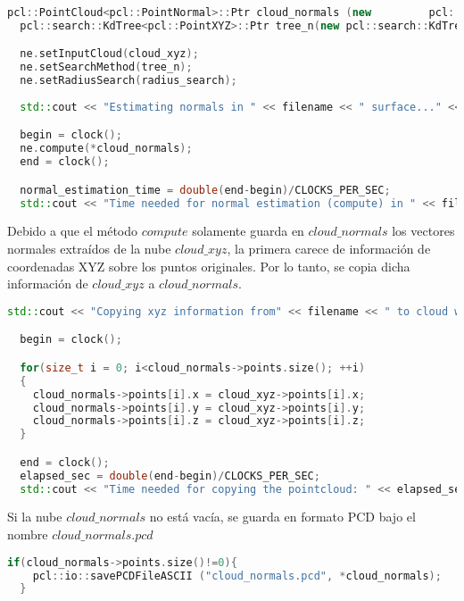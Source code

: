 \begin{lstlisting}[language=C++,breaklines]
  pcl::PointCloud<pcl::PointNormal>::Ptr cloud_normals (new 		pcl::PointCloud<pcl::PointNormal>);
  pcl::search::KdTree<pcl::PointXYZ>::Ptr tree_n(new pcl::search::KdTree<pcl::PointXYZ>());

  ne.setInputCloud(cloud_xyz);
  ne.setSearchMethod(tree_n);
  ne.setRadiusSearch(radius_search);
 
  std::cout << "Estimating normals in " << filename << " surface..." <<std::endl;

  begin = clock();
  ne.compute(*cloud_normals);
  end = clock();

  normal_estimation_time = double(end-begin)/CLOCKS_PER_SEC;
  std::cout << "Time needed for normal estimation (compute) in " << filename << ": " << normal_estimation_time << " seconds" << std::endl << std::endl;
\end{lstlisting}
  
Debido a que el método $compute$ solamente guarda en $cloud\_normals$ los vectores normales extraídos de la nube $cloud\_xyz$, la primera carece de información de coordenadas XYZ sobre los puntos originales. Por lo tanto, se copia dicha información de $cloud\_xyz$ a $cloud\_normals$.

\begin{lstlisting}[language=C++,breaklines]
  std::cout << "Copying xyz information from" << filename << " to cloud with normals information..." << std::endl;

  begin = clock();

  for(size_t i = 0; i<cloud_normals->points.size(); ++i)
  {
  	cloud_normals->points[i].x = cloud_xyz->points[i].x;
  	cloud_normals->points[i].y = cloud_xyz->points[i].y;
  	cloud_normals->points[i].z = cloud_xyz->points[i].z;
  }

  end = clock();
  elapsed_sec = double(end-begin)/CLOCKS_PER_SEC;
  std::cout << "Time needed for copying the pointcloud: " << elapsed_sec <<" seconds" << std::endl << std::endl;
\end{lstlisting}

  Si la nube $cloud\_normals$ no está vacía, se guarda en formato PCD bajo el nombre $cloud\_normals.pcd$
  
\begin{lstlisting}[language=C++,breaklines]
  if(cloud_normals->points.size()!=0){
  	pcl::io::savePCDFileASCII ("cloud_normals.pcd", *cloud_normals);
  }
\end{lstlisting}

